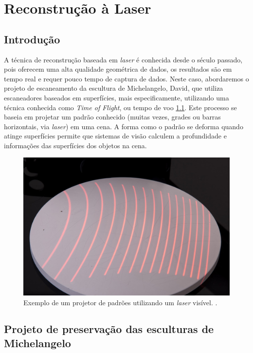 \chapter{Reconstrução à Laser}\label{cap:laser}

\section*{Introdução}

A técnica de reconstrução baseada em \emph{laser} é conhecida desde o século passado, pois oferecem uma alta qualidade geométrica de dados, os resultados são em tempo real e requer pouco tempo de captura de dados. 
Neste caso, abordaremos o projeto de escaneamento da escultura de Michelangelo, David, que utiliza escaneadores baseados em superfícies, mais especificamente, utilizando uma técnica conhecida como \emph{Time of Flight}, ou tempo de voo \ref{fig:luzestruturada}. Este processo se baseia em projetar um padrão conhecido (muitas vezes, grades ou barras horizontais, via \emph{laser}) em uma cena. A forma como o padrão se deforma quando atinge superfícies permite que sistemas de visão calculem a profundidade e informações das superfícies dos objetos na cena.

\begin{figure}[!h]
	\centering
	\includegraphics[width=0.7\linewidth]{figs/luzestruturada.jpg}
	\caption{%
	Exemplo de um projetor de padrões utilizando um \emph{laser} visível.
	\cite{luzEstruturada}.
	}\label{fig:luzestruturada}
\end{figure}

\section{Projeto de preservação das esculturas de Michelangelo}\label{sec:David}

